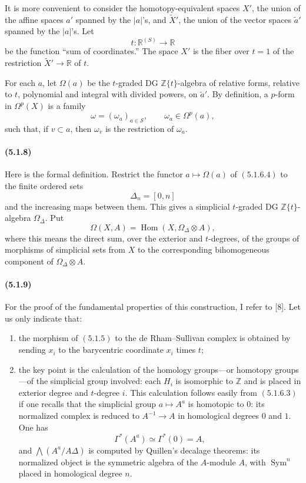 \documentclass[11pt]{article}
\theoremstyle{remark}
\newcommand{\ZZ}{\mathbb{Z}}
\newcommand{\RR}{\mathbb{R}}
\begin{document}
It is more convenient to consider the homotopy-equivalent spaces \(X'\), the union of the affine spaces \(a'\) spanned by the \(|a|\)'s, and \(\widetilde X'\), the union of the vector spaces \(\widetilde a'\) spanned by the \(|a|\)'s.  Let
\[
t:\RR^{(S)}\longrightarrow \RR
\]
be the function ``sum of coordinates.''  The space \(X'\) is the fiber over \(t=1\) of the restriction \(\widetilde X'\to\RR\) of \(t\).

For each \(a\), let \(\Omega(a)\) be the \(t\)-graded DG \(\ZZ\{t\}\)-algebra of relative forms, relative to \(t\), polynomial and integral with divided powers, on \(\widetilde a'\).  By definition, a \(p\)-form in \(\Omega^p(X)\) is a family
\[
\omega=(\omega_a)_{a\in\mathcal S},\qquad \omega_a\in\Omega^p(a),
\]
such that, if \(v\subset a\), then \(\omega_v\) is the restriction of \(\omega_a\).

\paragraph{(5.1.8)}
Here is the formal definition.  Restrict the functor \(a\mapsto \Omega(a)\) of \((5.1.6.4)\) to the finite ordered sets
\[
\Delta_n=[0,n]
\]
and the increasing maps between them.  This gives a simplicial \(t\)-graded DG \(\ZZ\{t\}\)-algebra \(\Omega_\Delta\).  Put
\[
\Omega(X,A)=\operatorname{Hom}(X,\Omega_\Delta\otimes A),
\]
where this means the direct sum, over the exterior and \(t\)-degrees, of the groups of morphisms of simplicial sets from \(X\) to the corresponding bihomogeneous component of \(\Omega_\Delta\otimes A\).

\paragraph{(5.1.9)}
For the proof of the fundamental properties of this construction, I refer to [8].  Let us only indicate that:
\begin{enumerate}[label=\alph*)]
\item the morphism of \((5.1.5)\) to the de Rham--Sullivan complex is obtained by sending \(x_i\) to the barycentric coordinate \(x_i\) times \(t\);
\item the key point is the calculation of the homology groups---or homotopy groups---of the simplicial group involved: each \(H_i\) is isomorphic to \(\ZZ\) and is placed in exterior degree and \(t\)-degree \(i\).  This calculation follows easily from \((5.1.6.3)\) if one recalls that the simplicial group \(a\mapsto A^a\) is homotopic to \(0\): its normalized complex is reduced to \(A^{-1}\to A\) in homological degrees \(0\) and \(1\).  One has
\[
\Gamma^*(A^a)\simeq \Gamma^*(0)=A,
\]
and \(\bigwedge(A^a/A\Delta)\) is computed by Quillen's decalage theorems: its normalized object is the symmetric algebra of the \(A\)-module \(A\), with \(\operatorname{Sym}^n\) placed in homological degree \(n\).
\end{enumerate}
\end{document}
